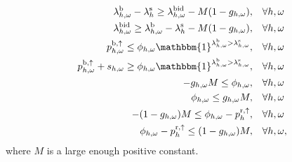 \begin{subequations}\label{eq:bid_constraint_relaxed}
    \begin{align}
        \lambda_{h,\omega}^{\rm{b}} - \lambda_{h}^{\rm{s}} \geq \lambda_{h,\omega}^{\rm{bid}} - M  (1 - g_{h,\omega}) , \quad                        & \forall{h,\omega}             \label{con_bid:subeq1}  \\
        \lambda_{h,\omega}^{\rm{bid}} \geq \lambda_{h,\omega}^{\rm{b}} - \lambda_{h}^{\rm{s}} - M  (1 - g_{h,\omega}) , \quad                        & \forall{h,\omega}             \label{con_bid:subeq2}  \\
        p^{\rm{b}, \uparrow}_{h,\omega} \leq \phi_{h,\omega}  \mathbbm{1}^{\lambda^{\rm{b}}_{h,\omega} > \lambda^{\rm{s}}_{h,\omega}}, \quad                & \forall{{h,\omega}}           \label{con_bid:subeq3}  \\
        p^{\rm{b}, \uparrow}_{h,\omega} + s_{h,\omega} \geq \phi_{h,\omega}  \mathbbm{1}^{\lambda^{\rm{b}}_{h,\omega} > \lambda^{\rm{s}}_{h,\omega}}, \quad & \forall{{h,\omega}}           \label{con_bid:subeq4}  \\
        -g_{h,\omega}  M \leq \phi_{h,\omega}, \quad                                                                                                 & \forall{h,\omega}             \label{con_bid:subeq5}  \\
        \phi_{h,\omega} \leq g_{h,\omega}  M, \quad                                                                                                  & \forall{h,\omega}             \label{con_bid:subeq6}  \\
        -(1 - g_{h,\omega})  M \leq \phi_{h,\omega} - p^{\rm{r},\uparrow}_{h}, \quad                                                                 & \forall{h,\omega}             \label{con_bid:subeq7}  \\
        \phi_{h,\omega} - p^{\rm{r},\uparrow}_{h} \leq (1 - g_{h,\omega})  M, \quad                                                                  & \forall{h,\omega},             \label{con_bid:subeq8}
    \end{align}
\end{subequations}
where $M$ is a large enough positive constant.
